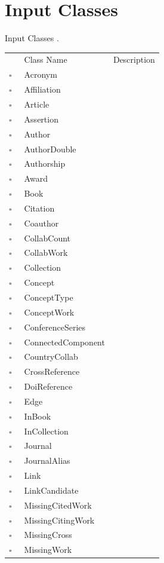 \chapter{Input Classes}
Input Classes     .
\begin{longtable}{llp{8cm}}
& Class Name & Description \\
$\square$\ & Acronym &  \\
$\square$\ & Affiliation &  \\
$\square$\ & Article &  \\
$\square$\ & Assertion &  \\
$\square$\ & Author &  \\
$\square$\ & AuthorDouble &  \\
$\square$\ & Authorship &  \\
$\square$\ & Award &  \\
$\square$\ & Book &  \\
$\square$\ & Citation &  \\
$\square$\ & Coauthor &  \\
$\square$\ & CollabCount &  \\
$\square$\ & CollabWork &  \\
$\square$\ & Collection &  \\
$\square$\ & Concept &  \\
$\square$\ & ConceptType &  \\
$\square$\ & ConceptWork &  \\
$\square$\ & ConferenceSeries &  \\
$\square$\ & ConnectedComponent &  \\
$\square$\ & CountryCollab &  \\
$\square$\ & CrossReference &  \\
$\square$\ & DoiReference &  \\
$\square$\ & Edge &  \\
$\square$\ & InBook &  \\
$\square$\ & InCollection &  \\
$\square$\ & Journal &  \\
$\square$\ & JournalAlias &  \\
$\square$\ & Link &  \\
$\square$\ & LinkCandidate &  \\
$\square$\ & MissingCitedWork &  \\
$\square$\ & MissingCitingWork &  \\
$\square$\ & MissingCross &  \\
$\square$\ & MissingWork &  \\

\end{longtable}
